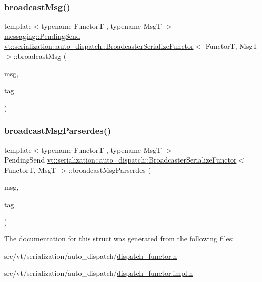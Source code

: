 \subsubsection{\texorpdfstring{broadcast\+Msg()}{broadcastMsg()}}
{\footnotesize\ttfamily template$<$typename FunctorT , typename MsgT $>$ \\
\hyperlink{structvt_1_1messaging_1_1_pending_send}{messaging\+::\+Pending\+Send} \hyperlink{structvt_1_1serialization_1_1auto__dispatch_1_1_broadcaster_serialize_functor}{vt\+::serialization\+::auto\+\_\+dispatch\+::\+Broadcaster\+Serialize\+Functor}$<$ FunctorT, MsgT $>$\+::broadcast\+Msg (\begin{DoxyParamCaption}\item[{MsgT $\ast$}]{msg,  }\item[{\hyperlink{namespacevt_a84ab281dae04a52a4b243d6bf62d0e52}{Tag\+Type} const \&}]{tag }\end{DoxyParamCaption})\hspace{0.3cm}{\ttfamily [static]}}

\mbox{\label{structvt_1_1serialization_1_1auto__dispatch_1_1_broadcaster_serialize_functor_a8dc424915a94365ac4247d686d35fcc1}} 
\subsubsection{\texorpdfstring{broadcast\+Msg\+Parserdes()}{broadcastMsgParserdes()}}
{\footnotesize\ttfamily template$<$typename FunctorT , typename MsgT $>$ \\
Pending\+Send \hyperlink{structvt_1_1serialization_1_1auto__dispatch_1_1_broadcaster_serialize_functor}{vt\+::serialization\+::auto\+\_\+dispatch\+::\+Broadcaster\+Serialize\+Functor}$<$ FunctorT, MsgT $>$\+::broadcast\+Msg\+Parserdes (\begin{DoxyParamCaption}\item[{MsgT $\ast$}]{msg,  }\item[{\hyperlink{namespacevt_a84ab281dae04a52a4b243d6bf62d0e52}{Tag\+Type} const \&}]{tag }\end{DoxyParamCaption})\hspace{0.3cm}{\ttfamily [static]}}



The documentation for this struct was generated from the following files\+:\begin{DoxyCompactItemize}
\item 
src/vt/serialization/auto\+\_\+dispatch/\hyperlink{dispatch__functor_8h}{dispatch\+\_\+functor.\+h}\item 
src/vt/serialization/auto\+\_\+dispatch/\hyperlink{dispatch__functor_8impl_8h}{dispatch\+\_\+functor.\+impl.\+h}\end{DoxyCompactItemize}
